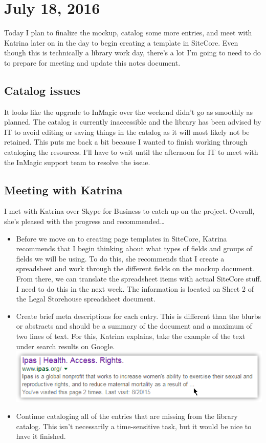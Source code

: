 \documentclass{article}
\begin{document}
\section{July 18, 2016}
Today I plan to finalize the mockup, catalog some more entries, and meet with Katrina later on in the day to begin creating a template in SiteCore. Even though this is technically a library work day, there's a lot I'm going to need to do to prepare for meeting and update this notes document.

\subsection{Catalog issues}
It looks like the upgrade to InMagic over the weekend didn't go as smoothly as planned. The catalog is currently inaccessible and the library has been advised by IT to avoid editing or saving things in the catalog as it will most likely not be retained. This puts me back a bit because I wanted to finish working through cataloging the resources. I'll have to wait until the afternoon for IT to meet with the InMagic support team to resolve the issue.

\subsection{Meeting with Katrina}
I met with Katrina over Skype for Business to catch up on the project. Overall, she's pleased with the progress and recommended\dots

\begin{itemize}
\itemsep0em 
    \item Before we move on to creating page templates in SiteCore, Katrina recommends that I begin thinking about what types of fields and groups of fields we will be using. To do this, she recommends that I create a spreadsheet and work through the different fields on the mockup document. From there, we can translate the spreadsheet items with actual SiteCore stuff. I need to do this in the next week. The information is located on Sheet 2 of the Legal Storehouse spreadsheet document.
    \item Create brief meta descriptions for each entry. This is different than the blurbs or abstracts and should be a summary of the document and a maximum of two lines of text. For this, Katrina explains, take the example of the text under search results on Google. \\
    \noindent\includegraphics[width=.80\textwidth]{2016-07-18-Google}
    \item Continue cataloging all of the entries that are missing from the library catalog. This isn't necessarily a time-sensitive task, but it would be nice to have it finished.
\end{itemize}
\end{document}
